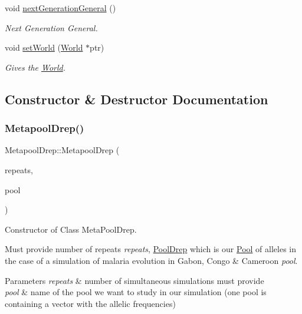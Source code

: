 \begin{DoxyCompactItemize}
void \hyperlink{class_metapool_drep_a5e96dd58811d326c74eaaa6df2fd14f2}{next\+Generation\+General} ()
\begin{DoxyCompactList}\small\item\em Next Generation General. \end{DoxyCompactList}\item 
void \hyperlink{class_metapool_drep_a67b44295a95152c8c760b0bb6ca1c42b}{set\+World} (\hyperlink{class_world}{World} $\ast$ptr)
\begin{DoxyCompactList}\small\item\em Gives the \hyperlink{class_world}{World}. \end{DoxyCompactList}\end{DoxyCompactItemize}


\subsection{Constructor \& Destructor Documentation}
\hypertarget{class_metapool_drep_a3b282bc91a103d690f176e1d563c5f3d}{}\label{class_metapool_drep_a3b282bc91a103d690f176e1d563c5f3d} 
\subsubsection{\texorpdfstring{Metapool\+Drep()}{MetapoolDrep()}\hspace{0.1cm}{\footnotesize\ttfamily [1/2]}}
{\footnotesize\ttfamily Metapool\+Drep\+::\+Metapool\+Drep (\begin{DoxyParamCaption}\item[{unsigned int const \&}]{repeats,  }\item[{\hyperlink{class_pool_drep}{Pool\+Drep} const \&}]{pool }\end{DoxyParamCaption})}



Constructor of Class Meta\+Pool\+Drep. 

Must provide number of repeats {\itshape repeats}, \hyperlink{class_pool_drep}{Pool\+Drep} which is our \hyperlink{class_pool}{Pool} of alleles in the case of a simulation of malaria evolution in Gabon, Congo \& Cameroon {\itshape pool}. 
\begin{DoxyParams}{Parameters}
{\em repeats} & number of simultaneous simulations must provide \\
\hline
{\em pool} & name of the pool we want to study in our simulation (one pool is containing a vector with the allelic frequencies) \\
\hline
\end{DoxyParams}
\hypertarget{class_metapool_drep_af22d366ba9cec3952af02381d74fb233}{}\label{class_metapool_drep_af22d366ba9cec3952af02381d74fb233} 
